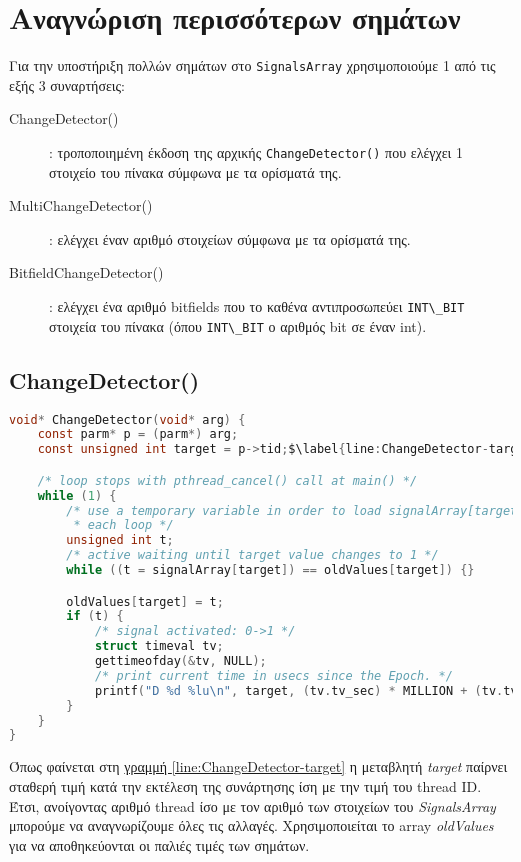 \chapter{Αναγνώριση περισσότερων σημάτων}

Για την υποστήριξη πολλών σημάτων στο \lstinline!SignalsArray! χρησιμοποιούμε 1 από 
τις εξής 3 συναρτήσεις:
\begin{description}
	\item[ChangeDetector()]: τροποποιημένη έκδοση της αρχικής 
	\lstinline!ChangeDetector()! που ελέγχει 1 στοιχείο του πίνακα σύμφωνα με τα 
	ορίσματά της.
	\item[MultiChangeDetector()]: ελέγχει έναν αριθμό στοιχείων σύμφωνα με τα 
	ορίσματά της.
	\item[BitfieldChangeDetector()]: ελέγχει ένα αριθμό bitfields που το καθένα 
	αντιπροσωπεύει \lstinline!INT\_BIT! στοιχεία του πίνακα (όπου \lstinline!INT\_BIT! 
	ο 
	αριθμός bit σε έναν int).
\end{description}

\section{ChangeDetector()}

\begin{lstlisting}[language=c, caption={ChangeDetector()}, escapechar=$]
void* ChangeDetector(void* arg) {
    const parm* p = (parm*) arg;
    const unsigned int target = p->tid;$\label{line:ChangeDetector-target}$

    /* loop stops with pthread_cancel() call at main() */
    while (1) {
        /* use a temporary variable in order to load signalArray[target] once in
         * each loop */
        unsigned int t;
        /* active waiting until target value changes to 1 */
        while ((t = signalArray[target]) == oldValues[target]) {}

        oldValues[target] = t;
        if (t) {
            /* signal activated: 0->1 */
            struct timeval tv;
            gettimeofday(&tv, NULL);
            /* print current time in usecs since the Epoch. */
            printf("D %d %lu\n", target, (tv.tv_sec) * MILLION + (tv.tv_usec));
        }
    }
}
\end{lstlisting}

Όπως φαίνεται στη \hyperref[line:ChangeDetector-target]{γραμμή 
\ref*{line:ChangeDetector-target}} η μεταβλητή \textit{target} παίρνει σταθερή 
τιμή κατά την εκτέλεση της συνάρτησης ίση με την τιμή του thread ID. Έτσι, 
ανοίγοντας αριθμό thread ίσο με τον αριθμό των στοιχείων του 
\textit{SignalsArray} μπορούμε να αναγνωρίζουμε όλες τις αλλαγές. Χρησιμοποιείται 
το array \textit{oldValues} για να αποθηκεύονται οι παλιές τιμές των σημάτων.

